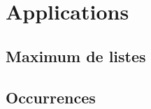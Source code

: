 \section{Applications}
\subsection{Maximum de listes}
\setcounter{thequestion}{0}

\subsection{Occurrences}
\setcounter{thequestion}{0}

